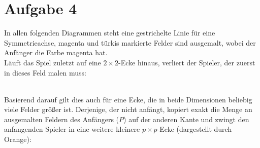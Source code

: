 \documentclass[12pt,a4paper,oneside]{article}
\begin{document}
\section[]{Aufgabe 4}
In allen folgenden Diagrammen steht eine gestrichelte Linie für eine Symmetrieachse, magenta und türkis markierte Felder sind ausgemalt, wobei der Anfänger die Farbe magenta hat. \\[10pt]
Läuft das Spiel zuletzt auf eine $2\times2$-Ecke hinaus, verliert der Spieler, der zuerst in dieses Feld malen muss: \\
\\ Basierend darauf gilt dies auch für eine Ecke, die in beide Dimensionen beliebig viele Felder größer ist. Derjenige, der nicht anfängt, kopiert exakt die Menge an ausgemalten Feldern des Anfängers ($P$) auf der anderen Kante und zwingt den anfangenden Spieler in eine weitere kleinere $p\times p$-Ecke (dargestellt durch Orange):\\
\end{document}
